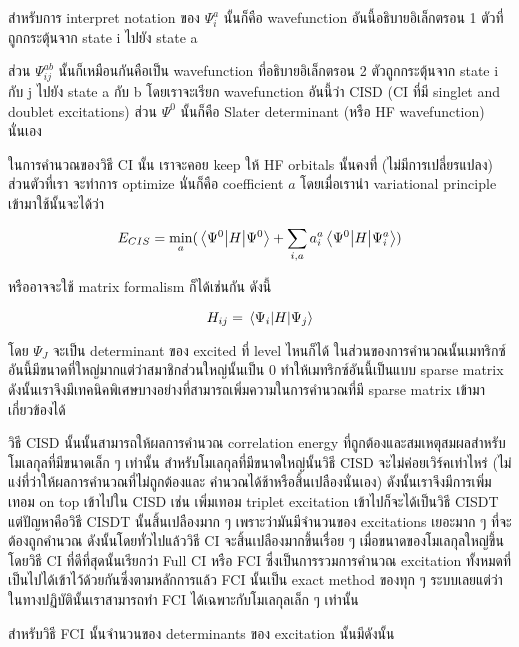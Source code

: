 สำหรับการ interpret notation ของ $\Psi^{a}_{i}$ นั้นก็คือ wavefunction อันนี้อธิบายอิเล็กตรอน 1 
ตัวที่ถูกกระตุ้นจาก state i ไปยัง state a 

ส่วน $\Psi^{ab}_{ij}$ นั้นก็เหมือนกันคือเป็น wavefunction ที่อธิบายอิเล็กตรอน 2 ตัวถูกกระตุ้นจาก 
state i กับ j ไปยัง state a กับ b โดยเราจะเรียก wavefunction อันนี้ว่า CISD (CI ที่มี singlet 
and doublet excitations) ส่วน $\Psi^{0}$ นั้นก็คือ Slater determinant (หรือ HF wavefunction) 
นั่นเอง 

ในการคำนวณของวิธี CI นั้น เราจะคอย keep ให้ HF orbitals นั้นคงที่ (ไม่มีการเปลี่ยรแปลง) ส่วนตัวที่เรา%
จะทำการ optimize นั่นก็คือ coefficient $a$ โดยเมื่อเรานำ variational principle เข้ามาใช้นั้นจะได้ว่า 

\begin{equation}
    E_{CIS} = \min_{a} ( \mel{\Psi^{0}}{H}{\Psi^{0}} 
    + \sum_{i,a} a^{a}_{i} \mel{\Psi^{0}}{H}{\Psi^{a}_{i}} )
\end{equation}

\noindent หรืออาจจะใช้ matrix formalism ก็ได้เช่นกัน ดังนี้

\begin{equation}
    H_{ij} = \mel{\Psi_{i}}{H}{\Psi_{j}}
\end{equation}

โดย $\Psi_{J}$ จะเป็น determinant ของ excited ที่ level ไหนก็ได้ ในส่วนของการคำนวณนั้นเมทริกซ์%
อันนี้มีขนาดที่ใหญ่มากแต่ว่าสมาชิกส่วนใหญ่นั้นเป็น 0 ทำให้เมทริกซ์อันนี้เป็นแบบ sparse matrix 
ดังนั้นเราจึงมีเทคนิคพิเศษบางอย่างที่สามารถเพิ่มความในการคำนวณที่มี sparse matrix เข้ามาเกี่ยวข้องได้

วิธี CISD นั้นนั้นสามารถให้ผลการคำนวณ correlation energy ที่ถูกต้องและสมเหตุสมผลสำหรับโมเลกุลที่มีขนาดเล็ก ๆ 
เท่านั้น สำหรับโมเลกุลที่มีขนาดใหญ่นั้นวิธี CISD จะไม่ค่อยเวิร์คเท่าไหร่ (ไม่แง่ที่ว่าให้ผลการคำนวณที่ไม่ถูกต้องและ%
คำนวณได้ช้าหรือสิ้นเปลืองนั่นเอง) ดังนั้นเราจึงมีการเพิ่มเทอม on top เข้าไปใน CISD เช่น เพิ่มเทอม triplet 
excitation เข้าไปก็จะได้เป็นวิธี CISDT แต่ปัญหาคือวิธี CISDT นั้นสิ้นเปลืองมาก ๆ เพราะว่ามันมีจำนวนของ 
excitations เยอะมาก ๆ ที่จะต้องถูกคำนวณ ดังนั้นโดยทั่วไปแล้ววิธี CI จะสิ้นเปลืองมากขึ้นเรื่อย ๆ 
เมื่อขนาดของโมเลกุลใหญ่ขึ้น โดยวิธี CI ที่ดีที่สุดนั้นเรียกว่า Full CI หรือ FCI ซึ่งเป็นการรวมการคำนวณ 
excitation ทั้งหมดที่เป็นไปได้เข้าไว้ด้วยกันซึ่งตามหลักการแล้ว FCI นั้นเป็น exact method ของทุก ๆ 
ระบบเลยแต่ว่าในทางปฏิบัตินั้นเราสามารถทำ FCI ได้เฉพาะกับโมเลกุลเล็ก ๆ เท่านั้น 

สำหรับวิธี FCI นั้นจำนวนของ determinants ของ excitation นั้นมีดังนั้น 


